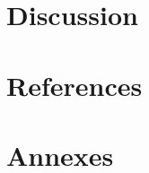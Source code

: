 \documentclass[a4paper,11pt]{article}
\begin{document}
\newpage
\section{Discussion}

\newpage
\section{References}
\renewcommand{\refname}{}


\newpage
\section{Annexes}
\end{document}

